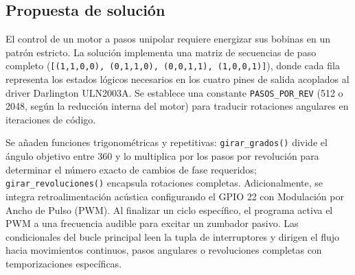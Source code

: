 \documentclass[letterpaper,12pt]{article}
\begin{document}
    \newpage

    \subsection*{Propuesta de solución}

    El control de un motor a pasos unipolar requiere energizar sus bobinas en un patrón estricto. La solución implementa una matriz de secuencias de paso completo (\texttt{[(1,1,0,0), (0,1,1,0), (0,0,1,1), (1,0,0,1)]}), donde cada fila representa los estados lógicos necesarios en los cuatro pines de salida acoplados al driver Darlington ULN2003A. Se establece una constante \texttt{PASOS\_POR\_REV} (512 o 2048, según la reducción interna del motor) para traducir rotaciones angulares en iteraciones de código.

    Se añaden funciones trigonométricas y repetitivas: \texttt{girar\_grados()} divide el ángulo objetivo entre 360 y lo multiplica por los pasos por revolución para determinar el número exacto de cambios de fase requeridos; \texttt{girar\_revoluciones()} encapsula rotaciones completas. Adicionalmente, se integra retroalimentación acústica configurando el GPIO 22 con Modulación por Ancho de Pulso (PWM). Al finalizar un ciclo específico, el programa activa el PWM a una frecuencia audible para excitar un zumbador pasivo. Las condicionales del bucle principal leen la tupla de interruptores y dirigen el flujo hacia movimientos continuos, pasos angulares o revoluciones completas con temporizaciones específicas.
\end{document}
